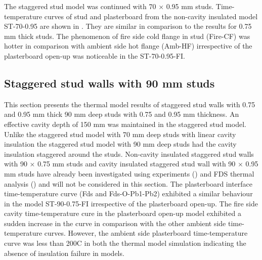 The staggered stud model was continued with 70 $\times$ 0.95 mm studs. Time-temperature curves of stud and plasterboard from the non-cavity insulated model ST-70-0.95 are shown in . They are similar in comparison to the results for 0.75 mm thick studs. The phenomenon of fire side cold flange in stud (Fire-CF) was hotter in comparison with ambient side hot flange (Amb-HF) irrespective of the plasterboard open-up was noticeable in the ST-70-0.95-FI.

\subsection{Staggered stud walls with 90 mm studs}

This section presents the thermal model results of staggered stud walls with 0.75 and 0.95 mm thick 90 mm deep studs with 0.75 and 0.95 mm thickness. An effective cavity depth of 150 mm was maintained in the staggered stud model. Unlike the staggered stud model with 70 mm deep studs with linear cavity insulation the staggered stud model with 90 mm deep studs had the cavity insulation staggered around the studs. Non-cavity insulated staggered stud walls with 90 $\times$ 0.75 mm studs and cavity insulated staggered stud wall with 90 $\times$ 0.95 mm studs have already been investigated using experiments () and FDS thermal analysis () and will not be considered in this section. The plasterboard interface time-temperature curve (Fds and Fds-O-Pb1-Pb2) exhibited a similar behaviour in the model ST-90-0.75-FI irrespective of the plasterboard open-up. The fire side cavity time-temperature cure in the plasterboard open-up model exhibited a sudden increase in the curve in comparison with the other ambient side time-temperature curves. However, the ambient side plasterboard time-temperature curve was less than 200\degree C in both the thermal model simulation indicating the absence of insulation failure in models.   


